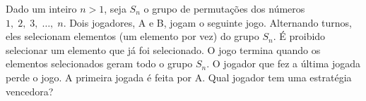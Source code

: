 Dado um inteiro \(n>1\), seja \(S_n\) o grupo de permutações dos números \(1,\;2,\;3,\;\ldots,\;n\). Dois jogadores, A e B, jogam o seguinte jogo. Alternando turnos, eles selecionam elementos (um elemento por vez) do grupo \(S_n\). É proibido selecionar um elemento que já foi selecionado. O jogo termina quando os elementos selecionados geram todo o grupo \(S_n\). O jogador que fez a última jogada perde o jogo. A primeira jogada é feita por A. Qual jogador tem uma estratégia vencedora?
